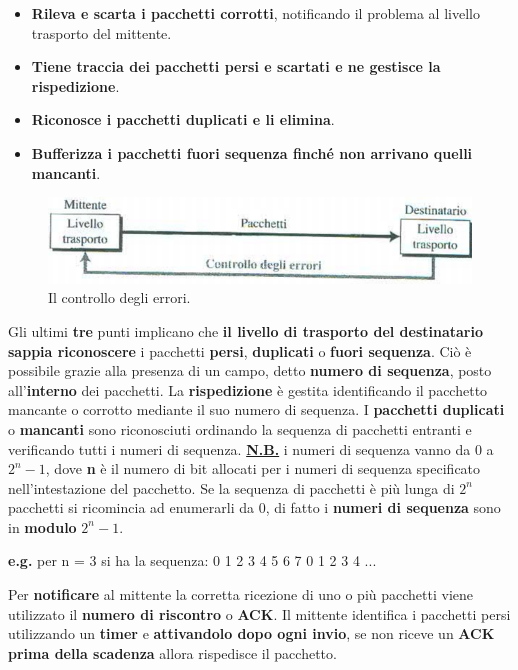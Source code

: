 \documentclass[11pt,a4paper]{article}
\theoremstyle{definition}
\begin{document}
\begin{itemize}
	\item \textbf{Rileva e scarta i pacchetti corrotti}, notificando il problema al livello trasporto del mittente.
	\item \textbf{Tiene traccia dei pacchetti persi e scartati e ne gestisce la rispedizione}.
	\item \textbf{Riconosce i pacchetti duplicati e li elimina}.
	\item \textbf{Bufferizza i pacchetti fuori sequenza finché non arrivano quelli mancanti}.
\end{itemize}
\begin{figure}[!h]
	\includegraphics[scale=0.5]{Immagini/Error_ctr.png}
	\centering
	\caption{Il controllo degli errori.}
\end{figure}
Gli ultimi \textbf{tre} punti implicano che \textbf{il livello di trasporto del destinatario} \textbf{sappia riconoscere} i pacchetti \textbf{persi}, \textbf{duplicati} o \textbf{fuori sequenza}. Ciò è possibile grazie alla presenza di un campo, detto \textbf{numero di sequenza}, posto all'\textbf{interno} dei pacchetti. La \textbf{rispedizione} è gestita identificando il pacchetto mancante o corrotto mediante il suo numero di sequenza. I \textbf{pacchetti duplicati} o \textbf{mancanti} sono riconosciuti ordinando la sequenza di pacchetti entranti e verificando tutti i numeri di sequenza.\newline
\underline{\textbf{N.B.}} i numeri di sequenza vanno da 0 a $2^n - 1$, dove \textbf{n} è il numero di bit allocati per i numeri di sequenza specificato nell'intestazione del pacchetto. Se la sequenza di pacchetti è più lunga di $2^n$ pacchetti si ricomincia ad enumerarli da 0, di fatto i \textbf{numeri di sequenza} sono in \textbf{modulo} $2^n - 1$.
\begin{center}
	\textbf{e.g.} per n = 3 si ha la sequenza: 0 1 2 3 4 5 6 7 0 1 2 3 4 ...
\end{center}
Per \textbf{notificare} al mittente la corretta ricezione di uno o più pacchetti viene utilizzato il \textbf{numero di riscontro} o \textbf{ACK}. Il mittente identifica i pacchetti persi utilizzando un \textbf{timer} e \textbf{attivandolo dopo ogni invio}, se non riceve un \textbf{ACK prima della scadenza} allora rispedisce il pacchetto.
\end{document}
